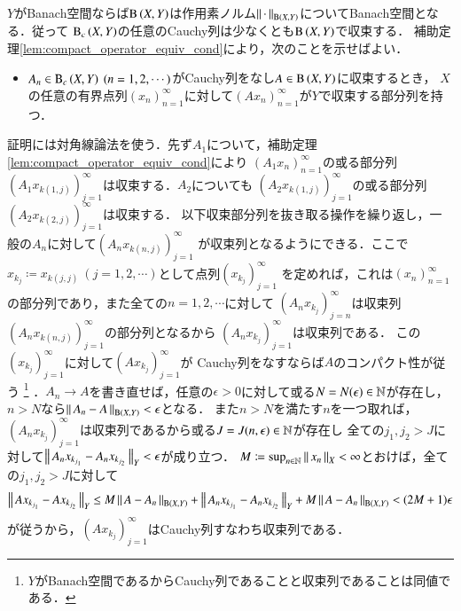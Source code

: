 	\begin{prf}
		$Y$がBanach空間ならば$\mathrm{B}\left(X,Y\right) $は作用素ノルム$\left\|\, \cdot\, \right\|_{\mathrm{B}\left(X,Y\right) }$についてBanach空間となる．従って
		$\mathrm{B}_c\left(X,Y\right) $の任意のCauchy列は少なくとも$\mathrm{B}\left(X,Y\right) $で収束する．
		補助定理\ref{lem:compact_operator_equiv_cond}により，次のことを示せばよい．
		\begin{itemize}
			\item $A_n \in \Cop{X}{Y} \ (n=1,2,\cdots)$がCauchy列をなし$A \in \mathrm{B}\left(X,Y\right) $に収束するとき，
			$X$の任意の有界点列$(x_n)_{n=1}^{\infty}$に対して$(Ax_n)_{n=1}^{\infty}$が$Y$で収束する部分列を持つ．
		\end{itemize}
		証明には対角線論法を使う．先ず$A_1$について，補助定理\ref{lem:compact_operator_equiv_cond}により
		$\left(A_1x_n\right)_{n=1}^{\infty}$の或る部分列$\left(A_1x_{k(1,j)}\right)_{j=1}^{\infty}$は収束する．$A_2$についても
		$\left(A_2x_{k(1,j)}\right)_{j=1}^{\infty}$の或る部分列$\left(A_2x_{k(2,j)}\right)_{j=1}^{\infty}$は収束する．
		以下収束部分列を抜き取る操作を繰り返し，一般の$A_n$に対して$\left(A_nx_{k(n,j)}\right)_{j=1}^{\infty}$
		が収束列となるようにできる．ここで$x_{k_j} \coloneqq x_{k(j,j)}\ (j=1,2,\cdots)$として点列$(x_{k_j})_{j=1}^{\infty}$
		を定めれば，これは$(x_n)_{n=1}^{\infty}$の部分列であり，また全ての$n=1,2,\cdots$に対して
		$\left(A_nx_{k_j}\right)_{j=n}^{\infty}$は収束列$\left(A_nx_{k(n,j)}\right)_{j=1}^{\infty}$の部分列となるから
		$\left(A_nx_{k_j}\right)_{j=1}^{\infty}$は収束列である．
		この$(x_{k_j})_{j=1}^{\infty}$に対して$\left(Ax_{k_j}\right)_{j=1}^{\infty}$が
		Cauchy列をなすならば$A$のコンパクト性が従う
		\footnote{
			$Y$がBanach空間であるからCauchy列であることと収束列であることは同値である．
		}
		．$A_n \rightarrow A$を書き直せば，任意の$\epsilon > 0$に対して或る$N = N(\epsilon) \in \mathbb{N}$が存在し，$n > N$なら$\left\|\, A_n - A\, \right\|_{\mathrm{B}\left(X,Y\right) } < \epsilon$となる．
		また$n > N$を満たす$n$を一つ取れば，$\left(A_nx_{k_j}\right)_{j=1}^{\infty}$は収束列であるから或る$J=J(n,\epsilon) \in \mathbb{N}$が存在し
		全ての$j_1,j_2 > J$に対して$\left\|\, A_nx_{k_{j_1}} - A_nx_{k_{j_2}}\, \right\|_{Y} < \epsilon$が成り立つ．
		$M \coloneqq \operatorname*{sup}_{n\in\mathbb{N}} \left\|\, x_n\, \right\|_{X} < \infty$とおけば，全ての$j_1,j_2 > J$に対して
		\begin{align}
			\left\|\, Ax_{k_{j_1}} - Ax_{k_{j_2}}\, \right\|_{Y} \leq M\left\|\, A- A_n\, \right\|_{\mathrm{B}\left(X,Y\right) } + \left\|\, A_nx_{k_{j_1}} - A_nx_{k_{j_2}}\, \right\|_{Y} + M\left\|\, A- A_n\, \right\|_{\mathrm{B}\left(X,Y\right) } < (2M+1)\epsilon
		\end{align}
		が従うから，$\left(Ax_{k_j}\right)_{j=1}^{\infty}$はCauchy列すなわち収束列である．
		\QED
	\end{prf}
	
